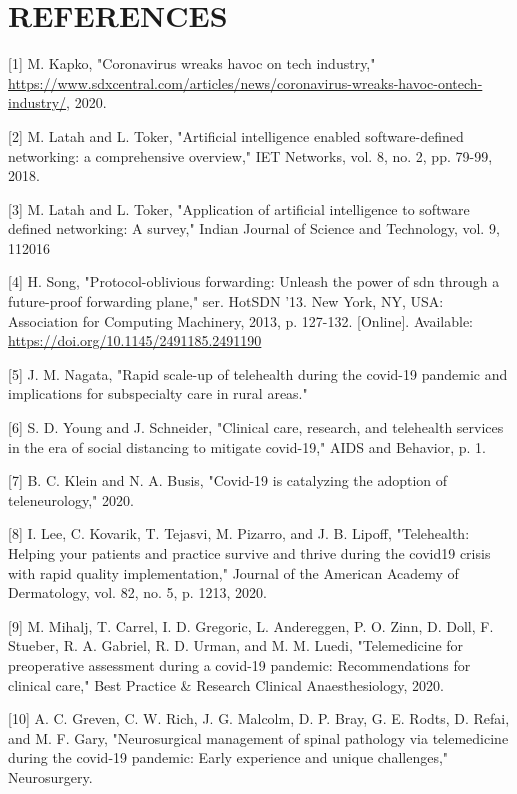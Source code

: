 \documentclass[10pt]{article}
\begin{document}
\section{REFERENCES}
[1] M. Kapko, "Coronavirus wreaks havoc on tech industry," \href{https://www.sdxcentral.com/articles/news/coronavirus-wreaks-havoc-ontech-industry/}{https://www.sdxcentral.com/articles/news/coronavirus-wreaks-havoc-ontech-industry/}, 2020.

[2] M. Latah and L. Toker, "Artificial intelligence enabled software-defined networking: a comprehensive overview," IET Networks, vol. 8, no. 2, pp. 79-99, 2018.

[3] M. Latah and L. Toker, "Application of artificial intelligence to software defined networking: A survey," Indian Journal of Science and Technology, vol. 9, 112016

[4] H. Song, "Protocol-oblivious forwarding: Unleash the power of sdn through a future-proof forwarding plane," ser. HotSDN '13. New York, NY, USA: Association for Computing Machinery, 2013, p. 127-132. [Online]. Available: \href{https://doi.org/10.1145/2491185.2491190}{https://doi.org/10.1145/2491185.2491190}

[5] J. M. Nagata, "Rapid scale-up of telehealth during the covid-19 pandemic and implications for subspecialty care in rural areas."

[6] S. D. Young and J. Schneider, "Clinical care, research, and telehealth services in the era of social distancing to mitigate covid-19," AIDS and Behavior, p. 1.

[7] B. C. Klein and N. A. Busis, "Covid-19 is catalyzing the adoption of teleneurology," 2020.

[8] I. Lee, C. Kovarik, T. Tejasvi, M. Pizarro, and J. B. Lipoff, "Telehealth: Helping your patients and practice survive and thrive during the covid19 crisis with rapid quality implementation," Journal of the American Academy of Dermatology, vol. 82, no. 5, p. 1213, 2020.

[9] M. Mihalj, T. Carrel, I. D. Gregoric, L. Andereggen, P. O. Zinn, D. Doll, F. Stueber, R. A. Gabriel, R. D. Urman, and M. M. Luedi, "Telemedicine for preoperative assessment during a covid-19 pandemic: Recommendations for clinical care," Best Practice \& Research Clinical Anaesthesiology, 2020.

[10] A. C. Greven, C. W. Rich, J. G. Malcolm, D. P. Bray, G. E. Rodts, D. Refai, and M. F. Gary, "Neurosurgical management of spinal pathology via telemedicine during the covid-19 pandemic: Early experience and unique challenges," Neurosurgery.
\end{document}
